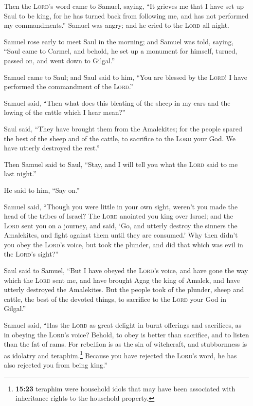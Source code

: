  Then the \textsc{Lord}'s word came to Samuel, saying,
 ``It grieves me that I have set up Saul to be king, for
he has turned back from following me, and has not performed my
commandments.'' Samuel was angry; and he cried to the \textsc{Lord} all
night.

 Samuel rose early to meet Saul in the morning; and
Samuel was told, saying, ``Saul came to Carmel, and behold, he set up a
monument for himself, turned, passed on, and went down to Gilgal.''

 Samuel came to Saul; and Saul said to him, ``You are
blessed by the \textsc{Lord}! I have performed the commandment of the
\textsc{Lord}.''

 Samuel said, ``Then what does this bleating of the sheep
in my ears and the lowing of the cattle which I hear mean?''

 Saul said, ``They have brought them from the Amalekites;
for the people spared the best of the sheep and of the cattle, to
sacrifice to the \textsc{Lord} your God. We have utterly destroyed the
rest.''

 Then Samuel said to Saul, ``Stay, and I will tell you
what the \textsc{Lord} said to me last night.''

He said to him, ``Say on.''

 Samuel said, ``Though you were little in your own sight,
weren't you made the head of the tribes of Israel? The \textsc{Lord}
anointed you king over Israel;  and the \textsc{Lord}
sent you on a journey, and said, `Go, and utterly destroy the sinners
the Amalekites, and fight against them until they are consumed.'
 Why then didn't you obey the \textsc{Lord}'s voice, but
took the plunder, and did that which was evil in the \textsc{Lord}'s
sight?''

 Saul said to Samuel, ``But I have obeyed the
\textsc{Lord}'s voice, and have gone the way which the \textsc{Lord}
sent me, and have brought Agag the king of Amalek, and have utterly
destroyed the Amalekites.  But the people took of the
plunder, sheep and cattle, the best of the devoted things, to sacrifice
to the \textsc{Lord} your God in Gilgal.''

 Samuel said, ``Has the \textsc{Lord} as great delight in
burnt offerings and sacrifices, as in obeying the \textsc{Lord}'s voice?
Behold, to obey is better than sacrifice, and to listen than the fat of
rams.  For rebellion is as the sin of witchcraft, and
stubbornness is as idolatry and teraphim.\footnote{\textbf{15:23}
  teraphim were household idols that may have been associated with
  inheritance rights to the household property.} Because you have
rejected the \textsc{Lord}'s word, he has also rejected you from being
king.''

